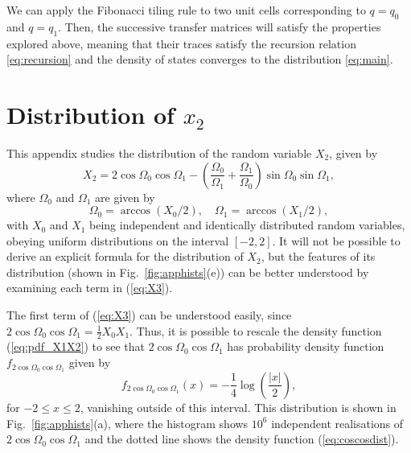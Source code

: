 \documentclass[nofootinbib,prb,amsmath,amssymb,twocolumn,floatfix]{revtex4-2}
\theoremstyle{definition}
\begin{document}
We can apply the Fibonacci tiling rule to two unit cells corresponding to $q=q_0$ and $q=q_1$. Then, the successive transfer matrices will satisfy the properties explored above, meaning that their traces satisfy the recursion relation \eqref{eq:recursion} and the density of states converges to the distribution \eqref{eq:main}.


\section{Distribution of $x_2$} \label{app:pdf_x2}

This appendix studies the distribution of the random variable $X_2$, given by
\begin{equation} \label{eq:X3}
	X_2 = 2\cos\Omega_0\cos\Omega_1-\left( \frac{\Omega_0}{\Omega_1} + \frac{\Omega_1}{\Omega_0} \right) \sin\Omega_0\sin\Omega_1,
\end{equation}
where $\Omega_0$ and $\Omega_1$ are given by
\begin{equation}
	\Omega_0=\arccos(X_0/2), \quad \Omega_1=\arccos(X_1/2),
\end{equation}
with $X_0$ and $X_1$ being independent and identically distributed random variables, obeying uniform distributions on the interval $[-2,2]$. It will not be possible to derive an explicit formula for the distribution of $X_2$, but the features of its distribution (shown in Fig.~\ref{fig:apphists}(e)) can be better understood by examining each term in (\ref{eq:X3}).

The first term of (\ref{eq:X3}) can be understood easily, since $2\cos\Omega_0\cos\Omega_1=\frac{1}{2}X_0X_1$. Thus, it is possible to rescale the density function (\ref{eq:pdf_X1X2}) to see that $2\cos\Omega_0\cos\Omega_1$ has probability density function $f_{2\cos\Omega_0\cos\Omega_1}$ given by
\begin{equation} \label{eq:coscosdist}
	f_{2\cos\Omega_0\cos\Omega_1}(x)=-\frac{1}{4}\log\left(\frac{|x|}{2}\right),
\end{equation}
for $-2\leq x\leq 2$, vanishing outside of this interval. This distribution is shown in Fig.~\ref{fig:apphists}(a), where the histogram shows $10^6$ independent realisations of $2\cos\Omega_0\cos\Omega_1$ and the dotted line shows the density function (\ref{eq:coscosdist}).
\end{document}
